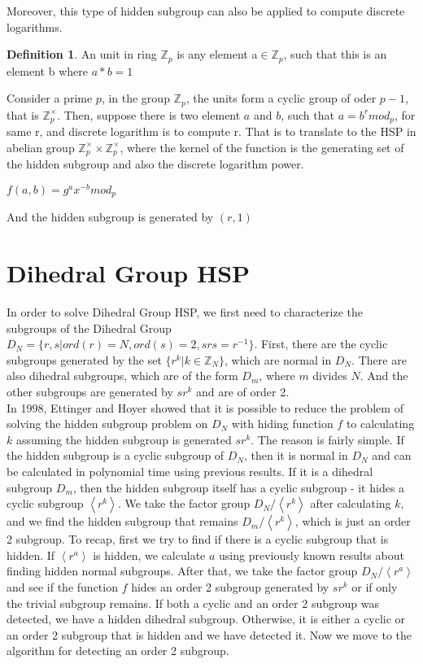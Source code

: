 \documentclass[12pt]{article}
\theoremstyle{plain}
\theoremstyle{definition}
\newtheorem{defn}[thm]{Definition} %
\begin{document}
Moreover, this type of hidden subgroup can also be applied to compute discrete logarithms. 
\begin{defn}
An unit in ring $\mathbb{Z}_{p}$ is any element a$\in \mathbb{Z}_{p}$, such that this is an element b where $a*b=1$
\end{defn}
Consider a prime $p$, in the group $\mathbb{Z}_{p}$, the  units form a cyclic group of oder $p-1$, that is $\mathbb{Z}_{p}^{\times}$.
Then, suppose there is two element $a$ and $b$, such that $ a=b^{r} mod_{p}$, for same r, and discrete logarithm is to compute r.
That is to translate to the HSP in abelian group $\mathbb{Z}_{p}^{\times}\times \mathbb{Z}_{p}^{\times}$, where the kernel of the function is the generating set of the hidden subgroup and also the discrete logarithm power.
\begin{center}                   $f(a,b)=g^{a}x^{-b} mod_{p}$ 
\end{center}
And the hidden subgroup is generated by $(r, 1)$   


\section{Dihedral Group HSP}
In order to solve Dihedral Group HSP, we first need to characterize the subgroups of the Dihedral Group $D_N=\lbrace r,s| ord(r)=N,ord(s)=2,srs=r^{-1}\rbrace$. First, there are the cyclic subgroups generated by the set $\lbrace r^k|k\in\mathbb{Z}_N\rbrace$, which are normal in $D_N$. There are also dihedral subgroups, which are of the form $D_m$, where $m$ divides $N$. And the other subgroups are generated by $sr^k$ and are of order 2. \\
In 1998, Ettinger and Hoyer	showed that it is possible to reduce the problem of solving the hidden subgroup problem on $D_N$ with hiding function $f$ to calculating $k$ assuming the hidden subgroup is generated $sr^k$. The reason is fairly simple. If the hidden subgroup is a cyclic subgroup of $D_N$, then it is normal in $D_N$ and can be calculated in polynomial time using previous results. If it is a dihedral subgroup $D_m$, then the hidden subgroup itself has a cyclic subgroup - it hides a cyclic subgroup $\left<r^k\right>$. We take the factor group $D_N/\left<r^k\right>$ after calculating $k$, and we find the hidden subgroup that remains $D_m/\left<r^k\right>$, which is just an order 2 subgroup. To recap, first we try to find if there is a cyclic subgroup that is hidden. If $\left<r^a\right>$ is hidden, we calculate $a$ using previously known results about finding hidden normal subgroups. After that, we take the factor group $D_N/\left<r^a\right>$ and see if the function $f$ hides an order 2 subgroup generated by $sr^k$ or if only the trivial subgroup remains. If both a cyclic and an order 2 subgroup was detected, we have a hidden dihedral subgroup. Otherwise, it is either a cyclic or an order 2 subgroup that is hidden and we have detected it. Now we move to the algorithm for detecting an order 2 subgroup.\\
\end{document}

